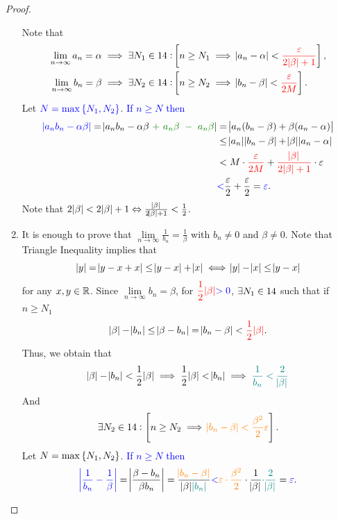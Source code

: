 \documentclass[11pt,openany]{article}
\begin{document}
\begin{note}[]
\begin{proof}
\begin{enumerate}[(1)]
\[	\] Note that \begin{align*}
		\lim\limits_{n\to\infty}a_n=\alpha\implies\exists N_1\in14:&\left[n\geq N_1\implies\abs{a_n-\alpha}<\textcolor{red}{\frac{\varepsilon}{2\abs{\beta}+1}}\right],\\ \lim\limits_{n\to\infty}b_n=\beta\implies\exists N_2\in14:&\left[n\geq N_2\implies\abs{b_n-\beta}<\textcolor{red}{\frac{\varepsilon}{2M}}\right].
	\end{align*} Let $\textcolor{blue}{N=\max\set{N_1,N_2}}$. \textcolor{blue}{If $n\geq N$ then} \begin{align*}
		\textcolor{blue}{\abs{a_nb_n-\alpha\beta}}=\abs{a_nb_n-\alpha\beta\ \textcolor{green!50!black}{+\ a_n\beta\ -\ a_n\beta}}&=\abs{a_n(b_n-\beta)+\beta(a_n-\alpha)}\\
		&\leq\abs{a_n}\abs{b_n-\beta}+\abs{\beta}\abs{a_n-\alpha}\\
		&<M\cdot\textcolor{red}{\frac{\varepsilon}{2M}}+\textcolor{red}{\frac{\abs{\beta}}{2\abs{\beta}+1}}\cdot\varepsilon\\
		&\textcolor{blue}{<}\frac{\varepsilon}{2}+\frac{\varepsilon}{2}=\textcolor{blue}{\varepsilon}.
	\end{align*} \textcolor{gray!50}{Note that $2\abs{\beta}<2\abs{\beta}+1\Leftrightarrow\frac{\abs{\beta}}{2\abs{\beta}+1}<\frac{1}{2}$.}
	\item It is enough to prove that $\displaystyle\lim\limits_{n\to\infty}\frac{1}{b_n}=\frac{1}{\beta}$ with $b_n\neq 0$ and $\beta\neq 0$. Note that Triangle Inequality implies that \[
	\abs{y}=\abs{y-x+x}\leq\abs{y-x}+\abs{x}\iff\abs{y}-\abs{x}\leq\abs{y-x}
	\] for any $x,y\in\mathbb{R}$. Since $\lim\limits_{n\to\infty}b_n=\beta$, for $\displaystyle\textcolor{red}{\frac{1}{2}\abs{\beta}}\textcolor{blue}{>0}$, $\exists N_1\in14$ such that if $n\geq N_1$ \[
	\abs{\beta}-\abs{b_n}\leq\abs{\beta-b_n}=\abs{b_n-\beta}<\textcolor{red}{\frac{1}{2}\abs{\beta}}.
	\] Thus, we obtain that \[
	\abs{\beta}-\abs{b_n}<\frac{1}{2}\abs{\beta}\implies\frac{1}{2}\abs{\beta}<\abs{b_n}\implies\textcolor{teal}{\frac{1}{b_n}<\frac{2}{\abs{\beta}}}
	\] And \[
	\exists N_2\in14:\left[n\geq N_2\implies\textcolor{orange}{\abs{b_n-\beta}<\frac{\beta^2}{2}\varepsilon}\right].
	\] Let \textcolor{blue}{$N=\max\set{N_1,N_2}$}. \textcolor{blue}{If $n\geq N$ then} \[
	\textcolor{blue}{\abs{\frac{1}{b_n}-\frac{1}{\beta}}}=\abs{\frac{\beta-b_n}{\beta b_n}}=\frac{\textcolor{orange}{\abs{b_n-\beta}}}{\abs{\beta}\textcolor{teal}{\abs{b_n}}}\textcolor{blue}{<}\textcolor{orange}{\varepsilon\cdot\frac{\beta^2}{2}}\cdot\frac{1}{\abs{\beta}}\textcolor{teal}{\cdot\frac{2}{\abs{\beta}}}=\textcolor{blue}{\varepsilon}.
\]
\end{enumerate}
\end{proof}
\end{note}
\end{document}
